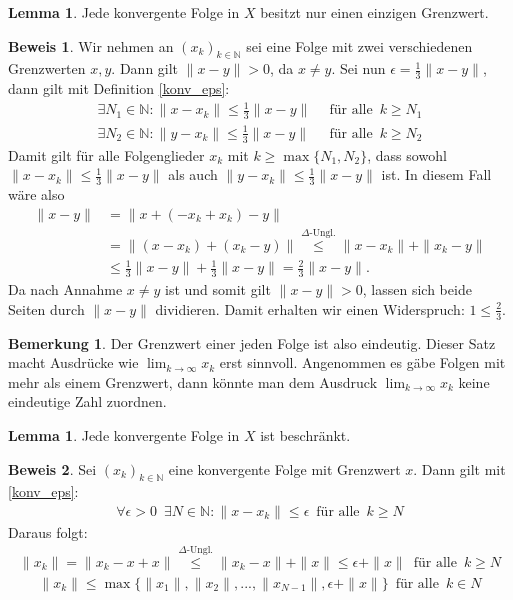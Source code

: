 \documentclass[10pt,a4paper]{article}
\theoremstyle{plain}
\theoremstyle{definition}
\newtheorem{lemma}[satz]{Lemma}
\newenvironment{lem}{\begin{shaded}\begin{lemma}}{\end{lemma}\end{shaded}}
\theoremstyle{nonumberplain}
\newtheorem{bemerkung}{Bemerkung}
\newenvironment{bem}{\begin{bemerkung}}{\end{bemerkung}}
\newtheorem{beweis}{Beweis}
\newenvironment{bew}{\begin{beweis}}{\end{beweis}}
\newcommand{\N}{\mathbb{N}}
\begin{document}
\begin{lem}
\label{eindeutigkeit}
Jede konvergente Folge in $X$ besitzt nur einen einzigen Grenzwert.
\end{lem}
\begin{bew}
Wir nehmen an ${(x_k)}_{k \in \N}$ sei eine Folge mit zwei verschiedenen Grenzwerten $x, y$. Dann gilt $\|x - y\| > 0$, da $x \neq y$. Sei nun $\epsilon = \frac{1}{3}\|x - y\|$, dann gilt mit Definition \hyperref[konv_eps]{\ref*{konv_eps}}:
\begin{align*}
\exists N_1 \in \N : \|x - x_k\| \leq \frac{1}{3}\|x - y\| & \enspace \text{für alle} \enspace k \geq N_1\\
\exists N_2 \in \N : \|y - x_k\| \leq \frac{1}{3}\|x - y\| & \enspace \text{für alle} \enspace k \geq N_2
\end{align*}
Damit gilt für alle Folgenglieder $x_k$ mit $k \geq \max\{N_1, N_2\}$, dass sowohl $\|x - x_k\| \leq \frac{1}{3}\|x - y\|$ als auch $\|y - x_k\| \leq \frac{1}{3}\|x - y\|$ ist. In diesem Fall wäre also 
\begin{align*}
\|x - y\| &= \|x + (-x_k + x_k) - y\|\\
&= \|(x - x_k) + (x_k - y)\| \overset{\Delta\text{-Ungl.}}\leq  \|x - x_k\| + \|x_k -y\|\\
&\leq \frac{1}{3}\|x - y\| + \frac{1}{3}\|x - y\| = \frac{2}{3}\|x - y\|.
\end{align*}
Da nach Annahme $x \neq y$ ist und somit gilt $\|x - y\| > 0$, lassen sich beide Seiten durch $\|x - y\|$ dividieren. Damit erhalten wir einen Widerspruch: $1 \leq \frac{2}{3}$.
\end{bew}
\begin{bem}
Der Grenzwert einer jeden Folge ist also eindeutig. Dieser Satz macht Ausdrücke wie $\lim_{k \to \infty}{x_k}$ erst sinnvoll. Angenommen es gäbe Folgen mit mehr als einem Grenzwert, dann könnte man dem Ausdruck $\lim_{k \to \infty}{x_k}$ keine eindeutige Zahl zuordnen.
\end{bem}
\begin{lem}
Jede konvergente Folge in $X$ ist beschränkt.
\end{lem}
\begin{bew}
Sei ${(x_k)}_{k \in \N}$ eine konvergente Folge mit Grenzwert $x$. Dann gilt mit \hyperref[konv_eps]{\ref*{konv_eps}}:
\begin{align*}
\forall \epsilon > 0 \enspace \exists N \in \N : \|x - x_k\| \leq \epsilon \enspace \text{für alle} \enspace k \geq N
\end{align*}
Daraus folgt:
\begin{align*}
\|x_k\| = \|x_k - x + x\| \overset{\Delta\text{-Ungl.}}\leq \|x_k - x\| + \|x\| \leq \epsilon + \|x\| \enspace \text{für alle} \enspace k \geq N
\end{align*}
\begin{align*}
\|x_k\| \leq \max\{\|x_1\|, \|x_2\|, ..., \|x_{N-1}\|, \epsilon + \|x\|\} \enspace \text{für alle} \enspace k \in N
\end{align*}
\end{bew}
\end{document}
